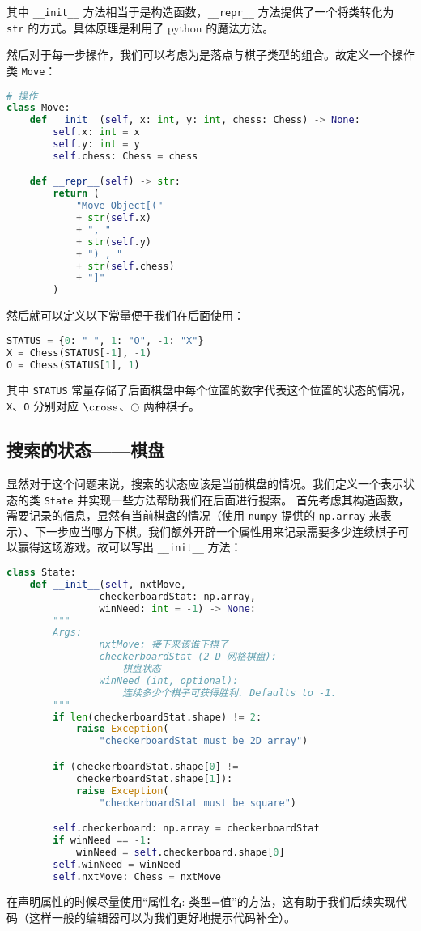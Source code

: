 其中 \verb`__init__` 方法相当于是构造函数，\verb`__repr__` 方法提供了一个将类转化为 \verb`str` 的方式。具体原理是利用了 python 的魔法方法。

然后对于每一步操作，我们可以考虑为是落点与棋子类型的组合。故定义一个操作类 \verb`Move`：
\begin{lstlisting}[language=python]
# 操作
class Move:
    def __init__(self, x: int, y: int, chess: Chess) -> None:
        self.x: int = x
        self.y: int = y
        self.chess: Chess = chess

    def __repr__(self) -> str:
        return (
            "Move Object[("
            + str(self.x)
            + ", "
            + str(self.y)
            + ") , "
            + str(self.chess)
            + "]"
        )
\end{lstlisting}
然后就可以定义以下常量便于我们在后面使用：
\begin{lstlisting}[language=python]
STATUS = {0: " ", 1: "O", -1: "X"}
X = Chess(STATUS[-1], -1)
O = Chess(STATUS[1], 1)
\end{lstlisting}
其中 \verb`STATUS` 常量存储了后面棋盘中每个位置的数字代表这个位置的状态的情况，\verb`X`、\verb`O` 分别对应 $\cross$、$\bigcirc$ 两种棋子。

\subsection{搜索的状态——棋盘}
显然对于这个问题来说，搜索的状态应该是当前棋盘的情况。我们定义一个表示状态的类 \verb`State` 并实现一些方法帮助我们在后面进行搜索。
首先考虑其构造函数，需要记录的信息，显然有当前棋盘的情况（使用 \verb`numpy` 提供的 \verb`np.array` 来表示）、下一步应当哪方下棋。我们额外开辟一个属性用来记录需要多少连续棋子可以赢得这场游戏。故可以写出 \verb`__init__` 方法：
\begin{lstlisting}[language=python]
class State:
    def __init__(self, nxtMove,
                checkerboardStat: np.array,
                winNeed: int = -1) -> None:
        """
        Args:
                nxtMove: 接下来该谁下棋了
                checkerboardStat (2 D 网格棋盘):
                    棋盘状态
                winNeed (int, optional):
                    连续多少个棋子可获得胜利. Defaults to -1.
        """
        if len(checkerboardStat.shape) != 2:
            raise Exception(
                "checkerboardStat must be 2D array")

        if (checkerboardStat.shape[0] !=
            checkerboardStat.shape[1]):
            raise Exception(
                "checkerboardStat must be square")

        self.checkerboard: np.array = checkerboardStat
        if winNeed == -1:
            winNeed = self.checkerboard.shape[0]
        self.winNeed = winNeed
        self.nxtMove: Chess = nxtMove
\end{lstlisting}
在声明属性的时候尽量使用“属性名: 类型=值”的方法，这有助于我们后续实现代码（这样一般的编辑器可以为我们更好地提示代码补全）。

